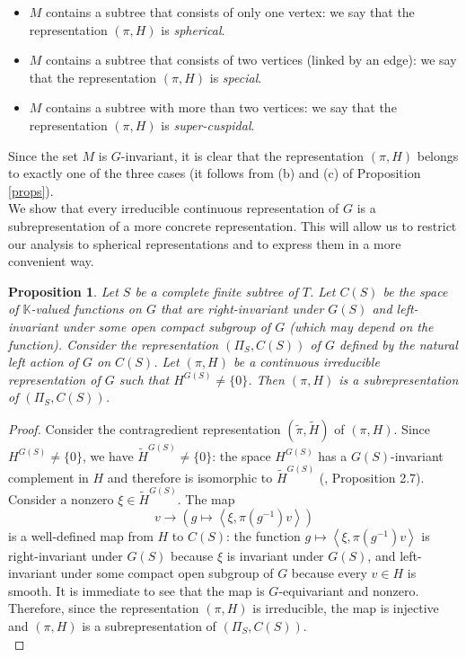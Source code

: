 \documentclass{article}
\theoremstyle{definition}
\theoremstyle{remark}
\theoremstyle{plain}
\newtheorem{prp}[dfn]{Proposition}
\begin{document}
\begin{itemize}
    \item $M$ contains a subtree that consists of only one vertex: we say that the representation $(\pi,H)$ is \textit{spherical}.
    \item $M$ contains a subtree that consists of two vertices (linked by an edge): we say that the representation $(\pi,H)$ is \textit{special}.
    \item $M$ contains a subtree with more than two vertices: we say that the representation $(\pi,H)$ is \textit{super-cuspidal}.
\end{itemize}

Since the set $M$ is $G$-invariant, it is clear that the representation $(\pi,H)$ belongs to exactly one of the three cases (it follows from (b) and (c) of Proposition \ref{props}). \\

We show that every irreducible continuous representation of $G$ is a subrepresentation of a more concrete representation. This will allow us to restrict our analysis to spherical representations and to express them in a more convenient way. \\

\begin{prp} \label{subr}
Let $S$ be a complete finite subtree of $T$. Let $C(S)$ be the space of $\mathbb{K}$-valued functions on $G$ that are right-invariant under $G(S)$ and left-invariant under some open compact subgroup of $G$ (which may depend on the function). Consider the representation $(\Pi_S,C(S))$ of $G$ defined by the natural left action of $G$ on $C(S)$. Let $(\pi,H)$ be a continuous irreducible representation of $G$ such that $H^{G(S)}\neq\{0\}$. Then $(\pi,H)$ is a subrepresentation of $(\Pi_S,C(S))$.
\end{prp}

\begin{proof}
Consider the contragredient representation $(\widetilde{\pi},\widetilde{H})$ of $(\pi,H)$. Since $H^{G(S)}\neq\{0\}$, we have $\widetilde{H}^{G(S)}\neq\{0\}$: the space $H^{G(S)}$ has a $G(S)$-invariant complement in $H$ and therefore is isomorphic to $\widetilde{H}^{G(S)}$ (\cite{bbej}, Proposition 2.7). \\

Consider a nonzero $\xi\in\widetilde H^{G(S)}$. The map $$v\rightarrow\left(g\mapsto\left\langle \xi,\pi(g^{-1})v\right\rangle\right)$$ is a well-defined map from $H$ to $C(S)$: the function $g\mapsto\left\langle \xi,\pi(g^{-1})v\right\rangle$ is right-invariant under $G(S)$ because $\xi$ is invariant under $G(S)$, and left-invariant under some compact open subgroup of $G$ because every $v\in H$ is smooth. It is immediate to see that the map is $G$-equivariant and nonzero. Therefore, since the representation $(\pi,H)$ is irreducible, the map is injective and $(\pi,H)$ is a subrepresentation of $(\Pi_S,C(S))$. \\
\end{proof}
\end{document}
